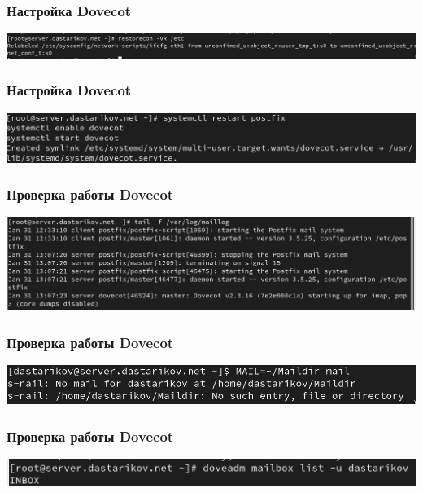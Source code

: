 \begin{frame}
\frametitle{Настройка Dovecot}
    \centering
    \includegraphics[width=\textwidth]{../images/image07.png}
\end{frame}

\begin{frame}
\frametitle{Настройка Dovecot}
    \centering
    \includegraphics[width=\textwidth]{../images/image08.png}
\end{frame}

\begin{frame}
\frametitle{Проверка работы Dovecot}
    \centering
    \includegraphics[width=\textwidth]{../images/image09.png}
\end{frame}

\begin{frame}
\frametitle{Проверка работы Dovecot}
    \centering
    \includegraphics[width=\textwidth]{../images/image10.png}
\end{frame}

\begin{frame}
\frametitle{Проверка работы Dovecot}
    \centering
    \includegraphics[width=\textwidth]{../images/image11.png}
\end{frame}

